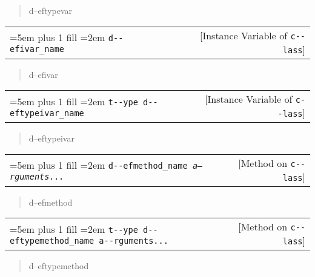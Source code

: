 \documentclass{book}
\begin{document}
%
\begin{quote}
\unskip{\parskip=0pt\noindent}%
d--eftypevar
\end{quote}


\noindent\begin{tabularx}{\linewidth}{@{}Xr}
\rightskip=5em plus 1 fill
\hangindent=2em
\texttt{d{-}{-}efivar\_name}& [Instance Variable of \texttt{c{-}{-}lass}]
\end{tabularx}

%
\begin{quote}
\unskip{\parskip=0pt\noindent}%
d--efivar
\end{quote}


\noindent\begin{tabularx}{\linewidth}{@{}Xr}
\rightskip=5em plus 1 fill
\hangindent=2em
\texttt{t{-}{-}ype d{-}{-}eftypeivar\_name}& [Instance Variable of \texttt{c{-}{-}lass}]
\end{tabularx}

%
\begin{quote}
\unskip{\parskip=0pt\noindent}%
d--eftypeivar
\end{quote}


\noindent\begin{tabularx}{\linewidth}{@{}Xr}
\rightskip=5em plus 1 fill
\hangindent=2em
\texttt{d{-}{-}efmethod\_name \EmbracOn{}\textnormal{\textsl{a--rguments...}}\EmbracOff{}}& [Method on \texttt{c{-}{-}lass}]
\end{tabularx}

%
\begin{quote}
\unskip{\parskip=0pt\noindent}%
d--efmethod
\end{quote}


\noindent\begin{tabularx}{\linewidth}{@{}Xr}
\rightskip=5em plus 1 fill
\hangindent=2em
\texttt{t{-}{-}ype d{-}{-}eftypemethod\_name a{-}{-}rguments...}& [Method on \texttt{c{-}{-}lass}]
\end{tabularx}

%
\begin{quote}
\unskip{\parskip=0pt\noindent}%
d--eftypemethod
\end{quote}
\end{document}
